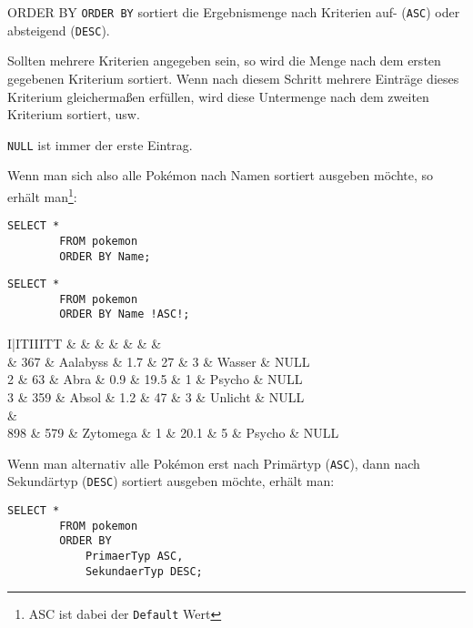 \begin{sql}{ORDER BY}
    \texttt{ORDER BY} sortiert die Ergebnismenge nach Kriterien auf- (\texttt{ASC}) oder absteigend (\texttt{DESC}).
    
    Sollten mehrere Kriterien angegeben sein, so wird die Menge nach dem ersten gegebenen Kriterium sortiert.
    Wenn nach diesem Schritt mehrere Einträge dieses Kriterium gleichermaßen erfüllen, wird diese Untermenge nach dem zweiten Kriterium sortiert, usw.

    \texttt{NULL} ist immer der erste Eintrag.
    
    Wenn man sich also alle Pokémon nach Namen sortiert ausgeben möchte, so erhält man\footnote{ASC ist dabei der \texttt{Default} Wert}:

    \begin{lstlisting}[language=mysql]
        SELECT *
        FROM pokemon
        ORDER BY Name;
    \end{lstlisting}

    \begin{lstlisting}[language=mysql]
        SELECT *
        FROM pokemon
        ORDER BY Name !ASC!;
    \end{lstlisting}

    \setcounter{rownum}{0}
    \begin{tabular}{I|ITIIITT}
        &  &  &  &  &  &  &  \\ & 367 & Aalabyss & 1.7 & 27 & 3 & Wasser & NULL \\
        2 & 63 & Abra & 0.9 & 19.5 & 1 & Psycho & NULL \\
        3 & 359 & Absol & 1.2 & 47 & 3 & Unlicht & NULL \\       
         &  \\
        898 & 579 & Zytomega & 1 & 20.1 & 5 & Psycho & NULL \\
    \end{tabular}

    Wenn man alternativ alle Pokémon erst nach Primärtyp (\texttt{ASC}), dann nach Sekundärtyp (\texttt{DESC}) sortiert ausgeben möchte, erhält man:
    
    \begin{lstlisting}[language=mysql]
        SELECT *
        FROM pokemon
        ORDER BY
            PrimaerTyp ASC,
            SekundaerTyp DESC;
    \end{lstlisting}


\end{sql}
